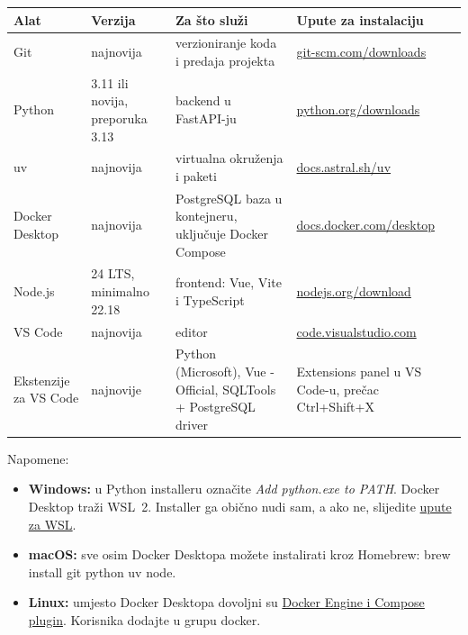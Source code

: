 \documentclass[11pt,a4paper]{article}
\newcommand{\code}[1]{{\ttfamily\small #1}}
\newcommand{\zaglavlje}{\rowcolor{tint}}
\begin{document}
\begin{center}\small
\begin{tabularx}{\linewidth}{P{2.6cm}P{2.6cm}LP{4.2cm}}
\toprule
\zaglavlje \textbf{Alat} & \textbf{Verzija} & \textbf{Za što služi} & \textbf{Upute za instalaciju}\\
\midrule
Git & najnovija & verzioniranje koda i predaja projekta & \href{https://git-scm.com/downloads}{git-scm.com/downloads}\\
Python & 3.11 ili novija, preporuka 3.13 & backend u FastAPI-ju & \href{https://www.python.org/downloads/}{python.org/downloads}\\
uv & najnovija & virtualna okruženja i paketi & \href{https://docs.astral.sh/uv/getting-started/installation/}{docs.astral.sh/uv}\\
Docker Desktop & najnovija & PostgreSQL baza u kontejneru, uključuje Docker Compose & \href{https://docs.docker.com/desktop/}{docs.docker.com/desktop}\\
Node.js & 24 LTS, minimalno 22.18 & frontend: Vue, Vite i TypeScript & \href{https://nodejs.org/en/download}{nodejs.org/download}\\
VS Code & najnovija & editor & \href{https://code.visualstudio.com/download}{code.visualstudio.com}\\
Ekstenzije za VS Code & najnovije & Python (Microsoft), Vue - Official, SQLTools + PostgreSQL driver & Extensions panel u VS Code-u, prečac Ctrl+Shift+X\\
\bottomrule
\end{tabularx}
\end{center}

Napomene:
\begin{itemize}[leftmargin=1.2em,itemsep=0.2em,topsep=0pt]
  \item \textbf{Windows:} u Python installeru označite \emph{Add python.exe to PATH}.
        Docker Desktop traži WSL~2. Installer ga obično nudi sam, a ako ne, slijedite
        \href{https://learn.microsoft.com/windows/wsl/install}{upute za WSL}.
  \item \textbf{macOS:} sve osim Docker Desktopa možete instalirati kroz Homebrew:
        \code{brew install git python uv node}.
  \item \textbf{Linux:} umjesto Docker Desktopa dovoljni su
        \href{https://docs.docker.com/engine/install/}{Docker Engine i Compose plugin}.
        Korisnika dodajte u grupu \code{docker}.
\end{itemize}
\end{document}

